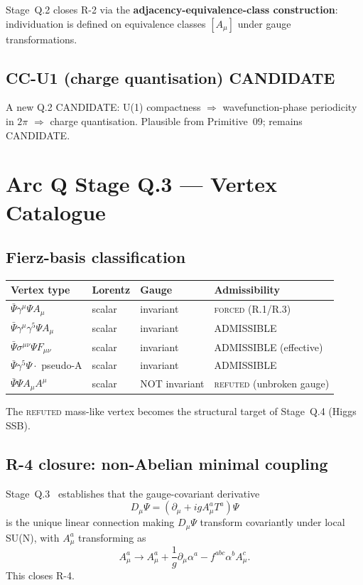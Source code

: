 \documentclass[11pt,a4paper]{article}
\begin{document}
Stage~Q.2 closes R-2 via the \textbf{adjacency-equivalence-class construction}: individuation is defined on equivalence classes $[A_\mu]$ under gauge transformations.

\subsection{CC-U1 (charge quantisation) CANDIDATE}

A new Q.2 CANDIDATE: U(1) compactness $\Rightarrow$ wavefunction-phase periodicity in $2\pi$ $\Rightarrow$ charge quantisation. Plausible from Primitive~09; remains CANDIDATE.

\section{Arc Q Stage Q.3 --- Vertex Catalogue}

\subsection{Fierz-basis classification}

\begin{center}
\begin{tabular}{llll}
\hline
Vertex type & Lorentz & Gauge & Admissibility \\
\hline
$\bar\Psi\gamma^\mu\Psi A_\mu$ & scalar & invariant & \textsc{forced} (R.1/R.3) \\
$\bar\Psi\gamma^\mu\gamma^5\Psi A_\mu$ & scalar & invariant & ADMISSIBLE \\
$\bar\Psi\sigma^{\mu\nu}\Psi F_{\mu\nu}$ & scalar & invariant & ADMISSIBLE (effective) \\
$\bar\Psi\gamma^5\Psi \cdot$ pseudo-A & scalar & invariant & ADMISSIBLE \\
$\bar\Psi\Psi A_\mu A^\mu$ & scalar & NOT invariant & \textsc{refuted} (unbroken gauge) \\
\hline
\end{tabular}
\end{center}

The \textsc{refuted} mass-like vertex becomes the structural target of Stage~Q.4 (Higgs SSB).

\subsection{R-4 closure: non-Abelian minimal coupling}

Stage~Q.3~\cite{q3vert} establishes that the gauge-covariant derivative
\begin{equation}
D_\mu \Psi = (\partial_\mu + ig A^a_\mu T^a) \Psi
\end{equation}
is the unique linear connection making $D_\mu \Psi$ transform covariantly under local SU(N), with $A^a_\mu$ transforming as
\begin{equation}
A^a_\mu \to A^a_\mu + \frac{1}{g}\partial_\mu \alpha^a - f^{abc} \alpha^b A^c_\mu.
\end{equation}
This closes R-4.
\end{document}
